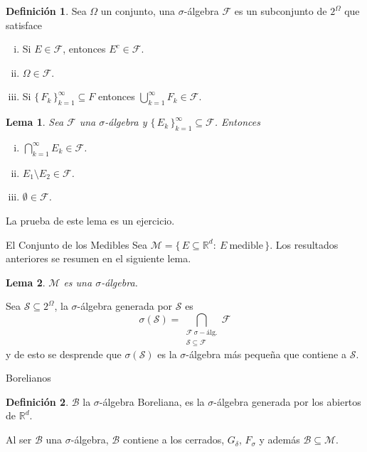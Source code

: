 \documentclass[utf8]{beamer}
\theoremstyle{plain}
\newtheorem{Lem}{Lema}                 %
\theoremstyle{definition}
\newtheorem{Def}{Definición}           %
\theoremstyle{remark}
\numberwithin{equation}{section}
\newcommand{\dl}{\delta}                %
\newcommand{\Om}{\Omega}                %
\newcommand{\sg}{\sigma}                %
\newcommand{\bR}{\mathbb{R}}    %
\newcommand{\cB}{\mathcal{B}}           %
\newcommand{\cF}{\mathcal{F}}           %
\newcommand{\cM}{\mathcal{M}}           %
\newcommand{\cS}{\mathcal{S}}           %
\newcommand{\set}[1]{\{\,#1\,\}}    %
\newcommand{\less}{\setminus}           %
\newcommand{\suck}{_{k=1}^\infty} %
\renewcommand{\.}{\Cdot}                %
\begin{document}
\begin{frame}
  \begin{Def}\label{def:sgAlgebra}
  Sea $\Om$ un conjunto, una \alert{$\sg$-álgebra} $\cF$ es un subconjunto de $2^\Om$ que satisface
  \begin{enumerate}[(i)]
    \item Si $E\in\cF$, entonces $E^c\in\cF$.
    \item $\Om\in\cF$.
    \item Si $\set{F_k}\suck\subseteq F$ entonces $\bigcup\suck F_k\in\cF$.
  \end{enumerate}
  \end{Def}

  \begin{Lem}\label{lem:whoisSigmaAlg}
    Sea $\cF$ una $\sg$-álgebra y $\set{E_k}\suck\subseteq\cF$. Entonces
    \begin{enumerate}[(i)]
      \item $\bigcap\suck E_k\in\cF$.
      \item $E_1\less E_2\in\cF$.
      \item $\emptyset\in\cF$.
    \end{enumerate}
  \end{Lem}
  La prueba de este lema es un \alert{ejercicio}.
\end{frame}

\begin{frame}{El Conjunto de los Medibles}
  Sea $\cM=\set{E\subseteq\bR^d:\ E\ \text{medible}}$. Los resultados anteriores se resumen en el siguiente lema.
  \begin{Lem}\label{lem:MesSgAlg}
    $\cM$ es una $\sg$-álgebra.
  \end{Lem}
  Sea $\cS\subseteq 2^\Om$, la \alert{$\sg$-álgebra generada por $\cS$} es 
  $$\sg(\cS)=\bigcap_{\substack{\cF\ \sg-\text{álg.}\\ \cS\subseteq \cF}}\cF$$
  y de esto se desprende que $\sg(\cS)$ es la $\sg$-álgebra más pequeña que contiene a $\cS$.
\end{frame}

\begin{frame}{Borelianos}
  \begin{Def}\label{def:borelSets}
    $\cB$ la $\sg$-álgebra \alert{Boreliana}, es la $\sg$-álgebra generada por los abiertos de $\bR^d$.
  \end{Def}
  Al ser $\cB$ una $\sg$-álgebra, $\cB$ contiene a los cerrados, $G_\dl$, $F_\sg$ y además $\cB\subseteq\cM$.
\end{frame}
\end{document}
